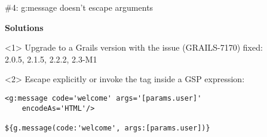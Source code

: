 \begin{frame}

  \vspace{.5cm}

  \begin{center}
    \Huge \#4: g:message doesn't escape arguments
  \end{center}

  \vspace{1cm}

    \Large
    \textbf{Solutions} \\[1em]

    \begin{onlyenv}<1>
      Upgrade to a Grails version with the issue (GRAILS-7170) fixed: \\[1em]
      2.0.5, 2.1.5, 2.2.2, 2.3-M1
    \end{onlyenv}

    \begin{onlyenv}<2>
      Escape explicitly or invoke the tag inside a GSP expression:
      \begin{center}
        \begin{minipage}{.9\textwidth}
          \begin{verbatim}
<g:message code='welcome' args='[params.user]'
    encodeAs='HTML'/>

${g.message(code:'welcome', args:[params.user])}
          \end{verbatim}
        \end{minipage}
      \end{center}
    \end{onlyenv}

    \vfill

\end{frame}



